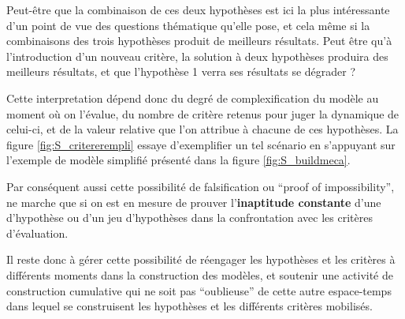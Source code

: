 Peut-être que la combinaison de ces deux hypothèses est ici la plus intéressante d'un point de vue des questions thématique qu'elle pose, et cela même si la combinaisons des trois hypothèses produit de meilleurs résultats. Peut être qu'à l'introduction d'un nouveau critère, la solution à deux hypothèses produira des meilleurs résultats, et que l'hypothèse 1 verra ses résultats se dégrader ?

Cette interpretation dépend donc du degré de complexification du modèle au moment où on l'évalue, du nombre de critère retenus pour juger la dynamique de celui-ci, et de la valeur relative que l'on attribue à chacune de ces hypothèses. La figure \ref{fig:S_critererempli} essaye d'exemplifier un tel scénario en s'appuyant sur l'exemple de modèle simplifié présenté dans la figure \ref{fig:S_buildmeca}.

Par conséquent aussi cette possibilité de falsification ou \foreignquote{english}{proof of impossibility}, ne marche que si on est en mesure de prouver l'\textbf{inaptitude constante} d'une d'hypothèse ou d'un jeu d'hypothèses dans la confrontation avec les critères d’évaluation.

Il reste donc à gérer cette possibilité de réengager les hypothèses et les critères à différents moments dans la construction des modèles, et soutenir une activité de construction cumulative qui ne soit pas \enquote{oublieuse} de cette autre espace-temps dans lequel se construisent les hypothèses et les différents critères mobilisés.
